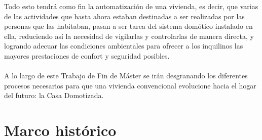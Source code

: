 Todo esto tendrá como fin la automatización de una vivienda, es decir, que varias de las actividades que hasta ahora estaban destinadas a ser realizadas por las personas que las habitaban, pasan a ser tarea del sistema domótico instalado en ella, reduciendo así la necesidad de vigilarlas y controlarlas de manera directa, y logrando adecuar las condiciones ambientales para ofrecer a los inquilinos las mayores prestaciones de confort y seguridad posibles.\\\\
A lo largo de este Trabajo de Fin de Máster se irán desgranando los diferentes procesos necesarios para que una vivienda convencional evolucione hacia el hogar del futuro: la Casa Domotizada. 

\section{Marco histórico}

